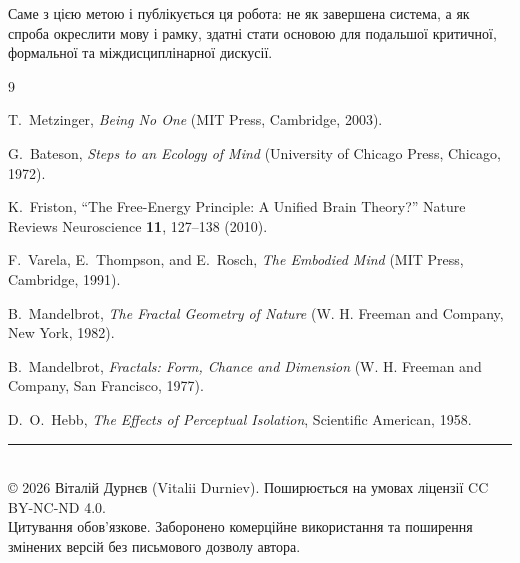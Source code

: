 \documentclass[aps,prd,onecolumn,nofootinbib,superscriptaddress]{revtex4-2}
\begin{document}
Саме з цією метою і публікується ця робота: не як завершена система, а як спроба окреслити мову і рамку, здатні стати основою для подальшої критичної, формальної та міждисциплінарної дискусії.


\begin{thebibliography}{9}

T.~Metzinger,
\textit{Being No One}
(MIT Press, Cambridge, 2003).

G.~Bateson,
\textit{Steps to an Ecology of Mind}
(University of Chicago Press, Chicago, 1972).

K.~Friston,
``The Free-Energy Principle: A Unified Brain Theory?''
Nature Reviews Neuroscience \textbf{11}, 127--138 (2010).

F.~Varela, E.~Thompson, and E.~Rosch,
\textit{The Embodied Mind}
(MIT Press, Cambridge, 1991).

B.~Mandelbrot,
\textit{The Fractal Geometry of Nature}
(W. H. Freeman and Company, New York, 1982).

B.~Mandelbrot,
\textit{Fractals: Form, Chance and Dimension}
(W. H. Freeman and Company, San Francisco, 1977).

D.~O.~Hebb,
\textit{The Effects of Perceptual Isolation},
Scientific American, 1958.
\end{thebibliography}

\vfill %
\begin{center}
    \rule{0.5\textwidth}{.4pt} \\ %
    \vspace{2mm}
    \footnotesize
    © 2026 Віталій Дурнєв (Vitalii Durniev). Поширюється на умовах ліцензії CC BY-NC-ND 4.0. \\
    Цитування обов’язкове. Заборонено комерційне використання та поширення змінених версій без письмового дозволу автора.
\end{center}
\end{document}
